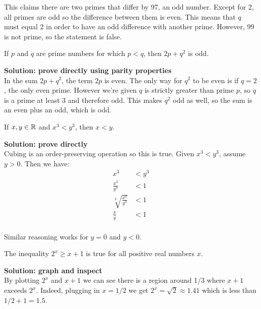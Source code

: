 \documentclass{article}
\begin{document}
This claims there are two primes that differ by 97, an odd number. Except for 2, all primes are odd so the difference between them is even. This means that $q$ must equal 2 in order to have an odd difference with another prime. However, 99 is not prime, so the statement is false.

\begin{problem}
If $p$ and $q$ are prime numbers for which $p < q$, then $2p + q^2$ is odd.
\end{problem}

\textbf{Solution: prove directly using parity properties}
\\

In the sum $2p + q^2$, the term $2p$ is even. The only way for $q^2$ to be even is if $q = 2$, the only even prime. However we're given $q$ is strictly greater than prime $p$, so $q$ is a prime at least 3 and therefore odd. This makes $q^2$ odd as well, so the sum is an even plus an odd, which is odd.

\begin{problem}
If $x, y \in \mathbb{R}$ and $x^3 < y^3$, then $x < y$.
\end{problem}

\textbf{Solution: prove directly}
\\

Cubing is an order-preserving operation so this is true. Given $x^3 < y^3$, assume $y > 0$. Then we have:
\begin{align*}
  x^3                       & < y^3 \\
  \frac{x^3}{y^3}           & < 1   \\
  \sqrt[3]{\frac{x^3}{y^3}} & < 1   \\
  \frac{x}{y}               & < 1   \\
\end{align*}

Similar reasoning works for $y = 0$ and $y < 0$.

\begin{problem}
The inequality $2^x \geq x + 1$ is true for all positive real numbers $x$.
\end{problem}

\textbf{Solution: graph and inspect}
\\

By plotting $2^x$ and $x + 1$ we can see there is a region around 1/3 where $x + 1$ exceeds $2^x$. Indeed, plugging in $x = 1/2$ we get $2^x = \sqrt{2} \approx 1.41$ which is less than $1/2 + 1 = 1.5$.
\end{document}
